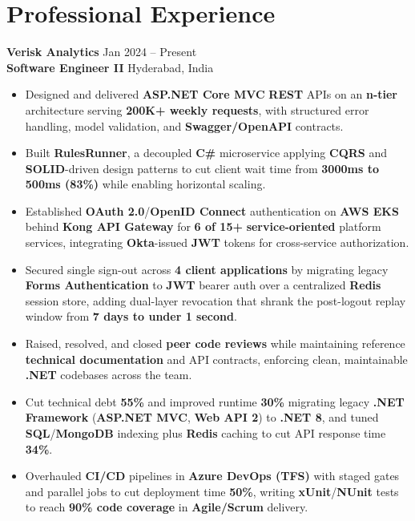 \documentclass[a4paper,10pt]{article}
\begin{document}
\section*{Professional Experience}

\textbf{Verisk Analytics} \hfill Jan 2024 -- Present \\
\textbf{Software Engineer II} \hfill Hyderabad, India

\begin{itemize}[leftmargin=*]
    \item Designed and delivered \textbf{ASP.NET Core MVC} \textbf{REST} APIs on an \textbf{n-tier} architecture serving \textbf{200K+ weekly requests}, with structured error handling, model validation, and \textbf{Swagger/OpenAPI} contracts.
    \item Built \textbf{RulesRunner}, a decoupled \textbf{C\#} microservice applying \textbf{CQRS} and \textbf{SOLID}-driven design patterns to cut client wait time from \textbf{3000ms to 500ms (83\%)} while enabling horizontal scaling.
    \item Established \textbf{OAuth 2.0}/\textbf{OpenID Connect} authentication on \textbf{AWS EKS} behind \textbf{Kong API Gateway} for \textbf{6 of 15+} \textbf{service-oriented} platform services, integrating \textbf{Okta}-issued \textbf{JWT} tokens for cross-service authorization.
    \item Secured single sign-out across \textbf{4 client applications} by migrating legacy \textbf{Forms Authentication} to \textbf{JWT} bearer auth over a centralized \textbf{Redis} session store, adding dual-layer revocation that shrank the post-logout replay window from \textbf{7 days to under 1 second}.
    \item Raised, resolved, and closed \textbf{peer code reviews} while maintaining reference \textbf{technical documentation} and API contracts, enforcing clean, maintainable \textbf{.NET} codebases across the team.
    \item Cut technical debt \textbf{55\%} and improved runtime \textbf{30\%} migrating legacy \textbf{.NET Framework} (\textbf{ASP.NET MVC}, \textbf{Web API 2}) to \textbf{.NET 8}, and tuned \textbf{SQL}/\textbf{MongoDB} indexing plus \textbf{Redis} caching to cut API response time \textbf{34\%}.
    \item Overhauled \textbf{CI/CD} pipelines in \textbf{Azure DevOps (TFS)} with staged gates and parallel jobs to cut deployment time \textbf{50\%}, writing \textbf{xUnit}/\textbf{NUnit} tests to reach \textbf{90\% code coverage} in \textbf{Agile/Scrum} delivery.
\end{itemize}
\end{document}
